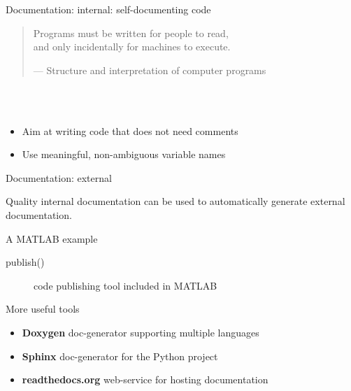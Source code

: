 \documentclass[10pt]{beamer}
\begin{document}
\begin{frame}{Documentation: internal: self-documenting code}

	\large
	\begin{quotation}
		Programs must be written for people to read, \\ and only
		incidentally for machines to execute.
		\begin{flushright}
			--- Structure and interpretation of computer programs
		\end{flushright}
	\end{quotation}

	\\~\\

	\begin{itemize}
	      \item Aim at writing code that does not need comments
	      \item Use meaningful, non-ambiguous variable names
	\end{itemize}

\end{frame}

\begin{frame}{Documentation: external}

	Quality internal documentation can be used to automatically
	generate external documentation.

	\begin{block}{A MATLAB example}
		\begin{description}
			\item[publish()] code publishing tool included in MATLAB
		\end{description}
	\end{block}

	\begin{block}{More useful tools}
		\begin{itemize}
			\item \textbf{Doxygen} doc-generator supporting multiple languages
			\item \textbf{Sphinx} doc-generator for the Python project
			\item \textbf{readthedocs.org} web-service for hosting documentation
		  \end{itemize}
	\end{block}

\end{frame}

\end{document}
